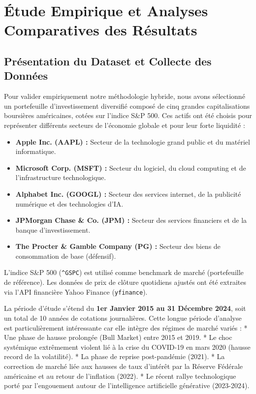 \chapter{Étude Empirique et Analyses Comparatives des Résultats}

\section{Présentation du Dataset et Collecte des Données}
Pour valider empiriquement notre méthodologie hybride, nous avons sélectionné un portefeuille d'investissement diversifié composé de cinq grandes capitalisations boursières américaines, cotées sur l'indice S\&P 500. Ces actifs ont été choisis pour représenter différents secteurs de l'économie globale et pour leur forte liquidité :
\begin{itemize}
    \item \textbf{Apple Inc. (AAPL) :} Secteur de la technologie grand public et du matériel informatique.
    \item \textbf{Microsoft Corp. (MSFT) :} Secteur du logiciel, du cloud computing et de l'infrastructure technologique.
    \item \textbf{Alphabet Inc. (GOOGL) :} Secteur des services internet, de la publicité numérique et des technologies d'IA.
    \item \textbf{JPMorgan Chase \& Co. (JPM) :} Secteur des services financiers et de la banque d'investissement.
    \item \textbf{The Procter \& Gamble Company (PG) :} Secteur des biens de consommation de base (défensif).
\end{itemize}

L'indice S\&P 500 (\texttt{\textasciicircum GSPC}) est utilisé comme benchmark de marché (portefeuille de référence). Les données de prix de clôture quotidiens ajustés ont été extraites via l'API financière Yahoo Finance (\texttt{yfinance}). 

La période d'étude s'étend du \textbf{1er Janvier 2015 au 31 Décembre 2024}, soit un total de 10 années de cotations journalières. Cette longue période d'analyse est particulièrement intéressante car elle intègre des régimes de marché variés :
* Une phase de hausse prolongée (Bull Market) entre 2015 et 2019.
* Le choc systémique extrêmement violent lié à la crise du COVID-19 en mars 2020 (hausse record de la volatilité).
* La phase de reprise post-pandémie (2021).
* La correction de marché liée aux hausses de taux d'intérêt par la Réserve Fédérale américaine et au retour de l'inflation (2022).
* Le récent rallye technologique porté par l'engouement autour de l'intelligence artificielle générative (2023-2024).

